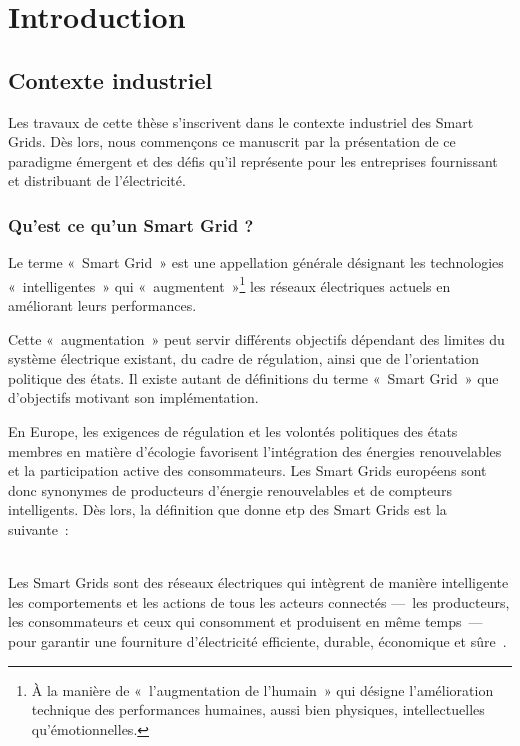 \chapter{Introduction}
\label{ch:problematique}


\section{Contexte industriel}

Les travaux de cette thèse s'inscrivent dans le contexte industriel des Smart Grids.
Dès lors, nous commençons ce manuscrit par la présentation de ce paradigme émergent et
des défis qu'il représente pour les entreprises fournissant et distribuant de l'électricité.

\subsection{Qu'est ce qu'un Smart Grid ?}

Le terme «~Smart Grid~» est une appellation générale désignant les technologies 
«~intelligentes~» qui «~augmentent~»\footnote{À la manière de «~l'augmentation 
de l'humain~» qui désigne l'amélioration technique des performances humaines, 
aussi bien physiques, intellectuelles qu'émotionnelles\cite{le2013humain}.} 
les réseaux électriques actuels en améliorant leurs performances. 

Cette «~augmentation~» peut servir différents objectifs dépendant des limites du 
système électrique existant, du cadre de régulation, ainsi que de 
l'orientation politique des états. Il existe autant de définitions du terme 
«~Smart Grid~» que d'objectifs motivant son implémentation. 

En Europe, les exigences de régulation et les volontés politiques des états 
membres en matière d'écologie favorisent l'intégration des énergies 
renouvelables et la participation active des consommateurs. Les Smart Grids 
européens sont donc synonymes de producteurs d'énergie renouvelables et de 
compteurs intelligents. Dès lors, la définition que donne \gls{etp} des
Smart Grids est la suivante~:
\\\
 \begin{definition}
Les Smart Grids sont des réseaux électriques qui intègrent de manière 
intelligente les comportements et 
les actions de tous les acteurs connectés —~les producteurs, les consommateurs 
et ceux qui consomment et produisent en même temps~— pour garantir une 
fourniture d'électricité efficiente, durable, économique et sûre~\cite{ETP}.
 \end{definition}

